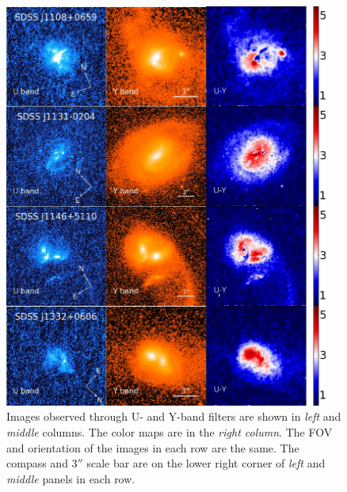 \begin{figure}
\begin{center}
\includegraphics[width=0.95\textwidth]{../_demoResources/figs/zhihu/color_map.pdf}
\caption{
Images observed through U- and Y-band filters are shown in {\it left} and {\it middle} columns. 
The color maps are in the {\it right column}. 
The FOV and orientation of the images in each row are the same.
The compass and $3''$ scale bar are on the lower right corner of {\it left} and {\it middle} panels in each row.
}
\label{fig:cmp}
\end{center}
\end{figure}



